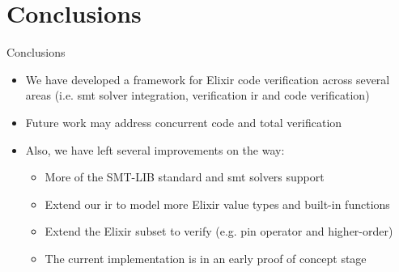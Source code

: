 \documentclass{beamer}
\begin{document}
  \section{Conclusions}
  \begin{frame}{Conclusions}
    \begin{itemize}
      \item \pause We have developed a framework for Elixir code verification across several areas (i.e. \acrshort*{smt} solver integration, verification \gls*{ir} and code verification)
      \item \pause Future work may address concurrent code and total verification
      \item \pause Also, we have left several improvements on the way:
      \begin{itemize}
        \item \pause More of the SMT-LIB standard and \acrshort*{smt} solvers support
        \item \pause Extend our \gls*{ir} to model more Elixir value types and built-in functions
        \item \pause Extend the Elixir subset to verify (e.g. pin operator and higher-order)
        \item \pause The current implementation is in an early proof of concept stage
      \end{itemize}
    \end{itemize}
  \end{frame}
  \appendix
  \maketitle
\end{document}
